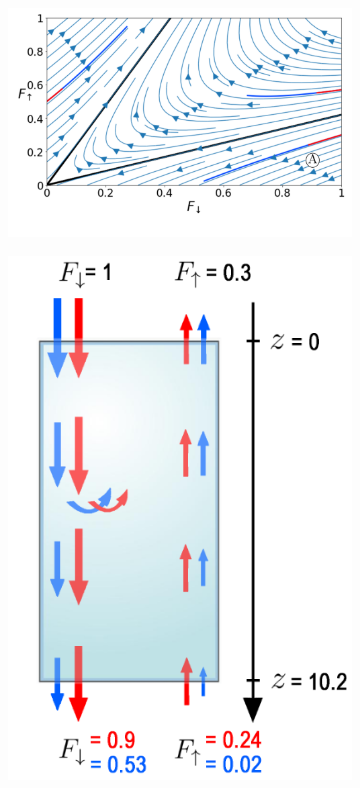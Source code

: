 \documentclass[12pt]{article}
\begin{document}
\begin{figure}[H]
    \centering
    \begin{subfigure}{0.645\textwidth}
        \includegraphics[width=1 \textwidth]{Graphe/bleu_rouge.png}
        \caption{}
        \label{subfig:graph.bleu_rouge}
    \end{subfigure}
    \begin{subfigure}{0.325\textwidth}
        \includegraphics[width=1 \textwidth]{Schema/bleu_rouge.png}

\end{subfigure}
\end{figure}
\end{document}
